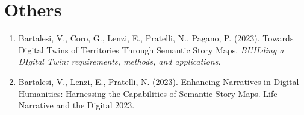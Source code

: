 \section*{Others}
\begin{enumerate}
    \item Bartalesi, V., Coro, G., Lenzi, E., Pratelli, N., Pagano, P. (2023). Towards Digital Twins of Territories Through Semantic Story Maps. \emph{BUILding a DIgital Twin: requirements, methods, and applications}.
    \item Bartalesi, V., Lenzi, E., Pratelli, N. (2023). Enhancing Narratives in Digital Humanities: Harnessing the Capabilities of Semantic Story Maps. Life Narrative and the Digital 2023.
\end{enumerate}














